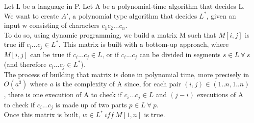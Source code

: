 
Let L be a language in P.
Let A be a polynomial-time algorithm that decides L.
We want to create $A'$, a polynomial type algorithm that decides $L^*$, given an input w consisting of characters $c_1c_2...c_n$.\\
To do so, using dynamic programming, we build a matrix M such that $M[i,j]$ is true iff $c_i...c_j \in L^*$. 
This matrix is built with a bottom-up approach, where $M[i,j]$ can be true if $c_i...c_j \in L$, or if $c_i...c_j$ can be divided in segments $s \in L\ \forall\ s$ (and therefore $c_i...c_j \in L^*$). \\
The process of building that matrix is done in polynomial time, more precisely in $O(a^3)$ where $a$ is the complexity of A since, for each pair $(i,j) \in (1..n, 1..n)$, there is one execution of A to check if $c_i...c_j\in L$ and $(j - i)$ executions of A to check if $c_i...c_j$ is made up of two parts $p \in L\ \forall\ p$. \\
Once this matrix is built, $w \in L^*\ iff\ M[1,n]$ is true.